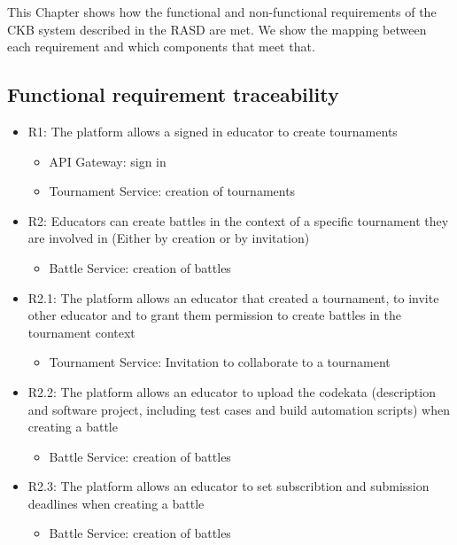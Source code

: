 This Chapter shows how the functional and non-functional requirements of the \ac{CKB} system described in the RASD are met. We show the mapping between each requirement and which components that meet that.

\subsection{Functional requirement traceability}
\begin{itemize}
    

\item R1:	The platform allows a signed in educator to create tournaments
\begin{itemize}
    \item API Gateway: sign in
    \item Tournament Service: creation of tournaments
\end{itemize}


\item R2:	Educators can create battles in the context of a specific tournament they are involved in (Either by creation or by invitation)
\begin{itemize}
\item Battle Service: creation of battles
\end{itemize}
\item R2.1: The platform allows an educator that created a tournament, to invite other educator and to grant them permission to create battles in the tournament context
\begin{itemize}
    \item Tournament Service: Invitation to collaborate to a tournament
\end{itemize}

\item R2.2:	The platform allows an educator to upload the codekata (description and software project, 
including test cases and build automation scripts) when creating a battle
\begin{itemize}
    \item Battle Service: creation of battles
\end{itemize}


\item R2.3: The platform allows an educator to set subscribtion and submission deadlines when creating a battle

\begin{itemize}
    \item Battle Service: creation of battles
\end{itemize}


\end{itemize}
